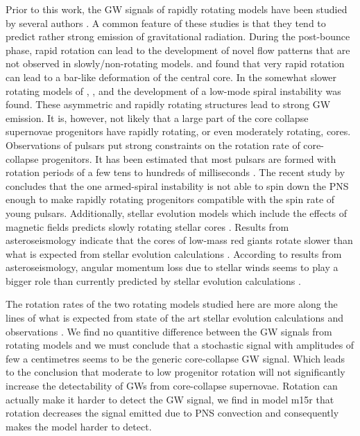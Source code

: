 {\comment
Prior to this work, the GW signals of rapidly rotating models have been studied 
by several authors \citep{mueller_82,rampp_98,shibata_05,ott_05,scheidegger_10,kuroda_14,takiwaki_16}. 
A common feature of these studies is that they tend to predict rather strong emission of gravitational radiation. 
During the post-bounce phase, rapid rotation can lead to the
development of novel flow patterns that are not observed in slowly/non-rotating models.
\cite{rampp_98} and \cite{shibata_05} found that very rapid rotation can
lead to a bar-like deformation of the central core. In the somewhat slower 
rotating models of \cite{ott_05}, \cite{kuroda_14}, and \cite{takiwaki_16} the development of
a low-mode spiral instability was found. These asymmetric and rapidly rotating structures
lead to strong GW emission. 
It is, however, not likely that a large part of the core collapse supernovae progenitors
have rapidly rotating, or even moderately rotating, cores. Observations of pulsars put
strong constraints on the rotation rate of core-collapse progenitors. It has been estimated that
most pulsars are formed with rotation periods of a few tens to hundreds of milliseconds \citep{vranesevic_04,popov_12,noutsos_13}.
The recent study by \cite{kazeroni_17} concludes that
the one armed-spiral instability \citep{ott_05,kuroda_14,takiwaki_16} is not able to spin down the PNS enough to make rapidly rotating progenitors compatible with the spin rate of young
pulsars. Additionally, stellar evolution models which include the effects of magnetic fields predicts
slowly rotating stellar cores \citep{heger_05}. Results from asteroseismology \citep{beck_12,mosser_12} indicate
that the cores of low-mass red giants rotate slower than what is expected from stellar evolution calculations \citep{cantiello_14,deheuvels_14}.
According to results from asteroseismology, angular momentum loss due to stellar winds seems to play a bigger role than currently predicted by stellar evolution calculations \citep{cantiello_14}. 

The rotation rates of the two rotating models studied here are more along the lines of what 
is expected from state of the art stellar evolution calculations \citep{heger_05} and observations 
\citep{beck_12,mosser_12,popov_12,noutsos_13,cantiello_14,deheuvels_14}. 
We find no quantitive difference between the GW signals from rotating models and we must conclude that
a stochastic signal with amplitudes of few a centimetres seems to be the generic core-collapse GW signal.
Which leads to the conclusion that moderate to low progenitor rotation will not significantly increase the detectability of GWs from core-collapse supernovae. Rotation can actually
make it harder to detect the GW signal, we find in model m15r that rotation decreases the signal emitted due to PNS convection and consequently makes the model harder to detect.  

}
